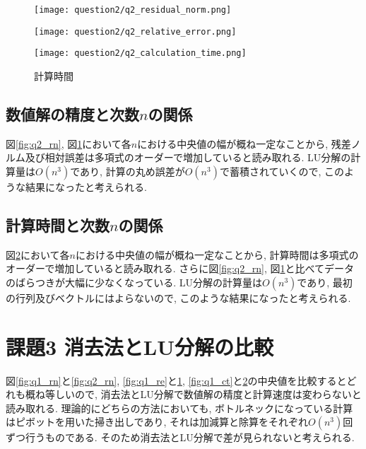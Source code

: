 \documentclass[uplatex,a4j]{jsarticle}
\begin{document}
\begin{figure}[htbp]
  \centering

  \begin{minipage}[t]{0.48\textwidth}
    \centering
    \texttt{[image: question2/q2\_residual\_norm.png]}
    \label{fig:q2_rn}
  \end{minipage}
  \hfill
  \begin{minipage}[t]{0.48\textwidth}
    \centering
    \texttt{[image: question2/q2\_relative\_error.png]}
    \label{fig:q2_re}
  \end{minipage}
  
\end{figure}

\begin{figure}[ht]
  \centering
  \texttt{[image: question2/q2\_calculation\_time.png]}
  \caption{計算時間}
  \label{fig:q2_ct}
\end{figure}

\newpage
\subsection{数値解の精度と次数$n$の関係}
\label{sec:q2_2}
図\ref{fig:q2_rn}, 図\ref{fig:q2_re}において各$n$における中央値の幅が概ね一定なことから, 
残差ノルム及び相対誤差は多項式のオーダーで増加していると読み取れる. 
LU分解の計算量は$O(n^3)$であり, 計算の丸め誤差が$O(n^3)$で蓄積されていくので, このような結果になったと考えられる.

\subsection{計算時間と次数$n$の関係}
\label{sec:q2_3}
図\ref{fig:q2_ct}において各$n$における中央値の幅が概ね一定なことから, 
計算時間は多項式のオーダーで増加していると読み取れる. 
さらに図\ref{fig:q2_rn}, 図\ref{fig:q2_re}と比べてデータのばらつきが大幅に少なくなっている.
LU分解の計算量は$O(n^3)$であり, 最初の行列及びベクトルにはよらないので, このような結果になったと考えられる.


\section{課題3 消去法とLU分解の比較}
図\ref{fig:q1_rn}と\ref{fig:q2_rn}, \ref{fig:q1_re}と\ref{fig:q2_re}, 
\ref{fig:q1_ct}と\ref{fig:q2_ct}の中央値を比較するとどれも概ね等しいので, 
消去法とLU分解で数値解の精度と計算速度は変わらないと読み取れる. 
理論的にどちらの方法においても, ボトルネックになっている計算はピボットを用いた掃き出しであり, 
それは加減算と除算をそれぞれ$O(n^3)$回ずつ行うものである. 
そのため消去法とLU分解で差が見られないと考えられる. 
\end{document}
